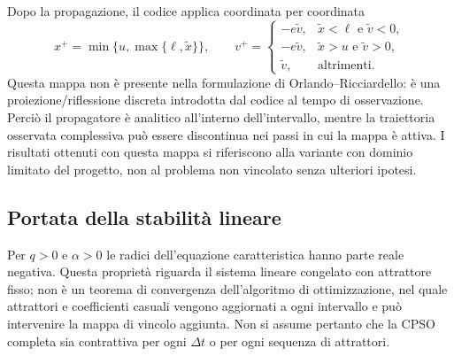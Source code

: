 Dopo la propagazione, il codice applica coordinata per coordinata
\begin{equation}
 x^+=\min\{u,\max\{\ell,\widetilde x\}\},\qquad
 v^+=\begin{cases}
 -e\widetilde v,&\widetilde x<\ell\text{ e }\widetilde v<0,\\
 -e\widetilde v,&\widetilde x>u\text{ e }\widetilde v>0,\\
 \widetilde v,&\text{altrimenti}.
 \end{cases}
 \label{eq:app-boundary-map}
\end{equation}
Questa mappa non è presente nella formulazione di Orlando--Ricciardello: è una proiezione/riflessione discreta introdotta dal codice al tempo di osservazione. Perciò il propagatore è analitico all'interno dell'intervallo, mentre la traiettoria osservata complessiva può essere discontinua nei passi in cui la mappa è attiva. I risultati ottenuti con questa mappa si riferiscono alla variante con dominio limitato del progetto, non al problema non vincolato senza ulteriori ipotesi.

\subsection{Portata della stabilità lineare}

Per $q>0$ e $\alpha>0$ le radici dell'equazione caratteristica hanno parte reale negativa. Questa proprietà riguarda il sistema lineare congelato con attrattore fisso; non è un teorema di convergenza dell'algoritmo di ottimizzazione, nel quale attrattori e coefficienti casuali vengono aggiornati a ogni intervallo e può intervenire la mappa di vincolo aggiunta. Non si assume pertanto che la CPSO completa sia contrattiva per ogni $\Delta t$ o per ogni sequenza di attrattori.
